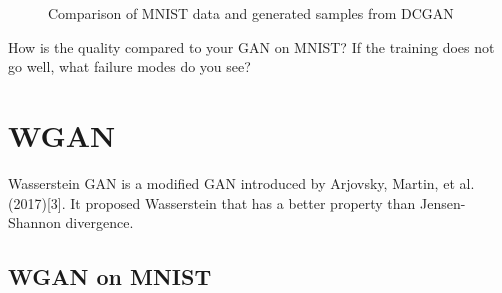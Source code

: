 \documentclass{article}
\begin{document}
\begin{figure}[!htb]
  \centering
  \caption{Comparison of MNIST data and generated samples from DCGAN}
  \label{fig:DCGAN_SVHN}
\end{figure}

How is the quality compared to your GAN on MNIST? If the training does not go well, what failure modes do you see?

\section{WGAN}

Wasserstein GAN is a modified GAN introduced by Arjovsky, Martin, et al.(2017)[3]. 
It proposed Wasserstein that has a better property than Jensen-Shannon divergence.

\subsection{WGAN on MNIST}
\end{document}
